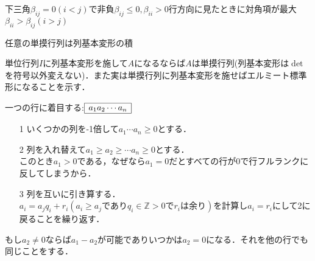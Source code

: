 下三角${\beta}_{ij}=0(i<j)$で非負${\beta}_{ij}\leq 0,{\beta}_{ii}>0$行方向に見たときに対角項が最大${\beta}_{ii}>{\beta}_{ij}(i>j)$

\begin{thm}
  任意の単摸行列は列基本変形の積
\end{thm}

単位行列$I$に列基本変形を施して$A$になるならば$A$は単摸行列(列基本変形は$\det$を符号以外変えない)．また実は単摸行列に列基本変形を施せばエルミート標準形になることを示す．

一つの行に着目する:$
\begin{array}{|c|}
  \hline
  a_1 a_2 \cdots a_n\\\hline
\end{array}
$
\begin{itemize}
  \item[1]いくつかの列を-1倍して$a_1 \cdots a_n \geq 0$とする．
  \item[2]列を入れ替えて$a_1 \geq a_2 \geq \cdots a_n \geq 0$とする．\\
  このとき$a_1 >0$である，なぜなら$a_1 =0$だとすべての行が0で行フルランクに反してしまうから．
  \item[3]列を互いに引き算する．$a_i = a_j q_i +r_i (a_i \geq a_j でありq_i \in\mathbb{Z}>0でr_i は余り)$を計算し$a_i =r_i$にして2に戻ることを繰り返す．
\end{itemize}

もし$a_2 \neq 0$ならば$a_1 -a_2$が可能でありいつかは$a_2 =0$になる．それを他の行でも同じことをする．
